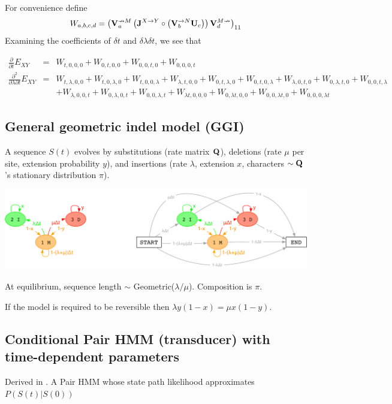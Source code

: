 \documentclass{article}
\begin{document}
For convenience define
\[
W_{a,b,c,d} =
\left( {\bf V}^{\nrightarrow M}_a \left( {\bf J}^{X \to Y} \circ \left( {\bf V}^{\rightarrow N}_b {\bf U}_c \right) \right) {\bf V}^{M \nrightarrow}_d \right)_{11}
\]
Examining the coefficients of $\delta t$ and $\delta \lambda \delta t$, we see that

\begin{eqnarray*}
  \frac{\partial}{\partial t}E_{XY} & = &
  W_{t,0,0,0} + W_{0,t,0,0} + W_{0,0,t,0} + W_{0,0,0,t}
  \\
  \frac{\partial^2}{\partial \lambda \partial t}E_{XY} & = &
  W_{t,\lambda,0,0} + W_{t,0,\lambda,0} + W_{t,0,0,\lambda}
  + W_{\lambda,t,0,0} + W_{0,t,\lambda,0} + W_{0,t,0,\lambda}
  + W_{\lambda,0,t,0} + W_{0,\lambda,t,0} + W_{0,0,t,\lambda}
  \\ & &
  + W_{\lambda,0,0,t} + W_{0,\lambda,0,t} + W_{0,0,\lambda,t}
  + W_{\lambda t,0,0,0} + W_{0,\lambda t,0,0} + W_{0,0,\lambda t,0} + W_{0,0,0,\lambda t}
\end{eqnarray*}

\subsection{General geometric indel model (GGI)}

A sequence $S(t)$ evolves by
substitutions (rate matrix ${\bf Q}$),
deletions (rate $\mu$ per site, extension probability $y$),
and
insertions (rate $\lambda$, extension $x$,
characters $\sim {\bf Q}$'s stationary distribution $\pi$).

\includegraphics[width=\textwidth]{InstantHMM.pdf}

At equilibrium, sequence length $\sim$ Geometric($\lambda/\mu$). Composition is $\pi$.

If the model is required to be reversible then $\lambda y(1-x) = \mu x(1-y)$.

\subsection{Conditional Pair HMM (transducer) with time-dependent parameters}
Derived in \cite{Holmes2020}.
A Pair HMM whose state path likelihood approximates $P(S(t)|S(0))$
\end{document}
